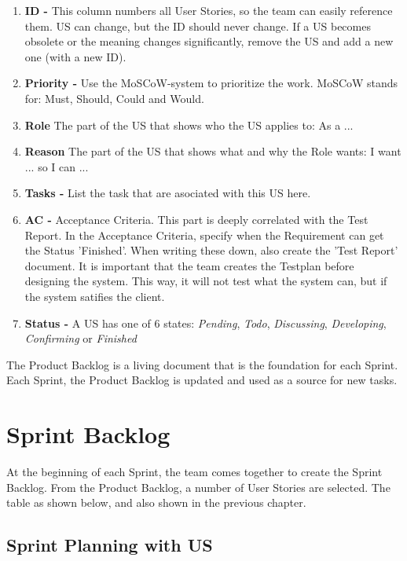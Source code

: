 \documentclass[10pt]{report}
\begin{document}
\begin{enumerate}
	\item \textbf{ID -} This column numbers all User Stories, so the team can easily reference them. US can change, but the ID should never change. If a US becomes obsolete or the meaning changes significantly, remove the US and add a new one (with a new ID).
	\item \textbf{Priority -} Use the MoSCoW-system to prioritize the work. MoSCoW stands for: Must, Should, Could and Would.
	\item \textbf{Role} The part of the US that shows who the US applies to: As a ...
	\item \textbf{Reason} The part of the US that shows what and why the Role wants: I want ... so I can ...
	\item \textbf{Tasks -} List the task that are asociated with this US here.
	\item \textbf{AC -} Acceptance Criteria. This part is deeply correlated with the Test Report. In the Acceptance Criteria, specify when the Requirement can get the Status 'Finished'. When writing these down, also create the 'Test Report' document. It is important that the team creates the Testplan before designing the system. This way, it will not test what the system can, but if the system satifies the client.
	\item \textbf{Status -} A US has one of 6 states: 
		\emph{Pending}, \emph{Todo}, \emph{Discussing}, \emph{Developing}, \emph{Confirming} or \emph{Finished}
\end{enumerate}

\noindent The Product Backlog is a living document that is the foundation for each Sprint. Each Sprint, the Product Backlog is updated and used as a source for new tasks.

\newpage

\section{Sprint Backlog}

At the beginning of each Sprint, the team comes together to create the Sprint Backlog. From the Product Backlog, a number of User Stories are selected. The table as shown below, and also shown in the previous chapter.

\subsection{Sprint Planning with US}
\end{document}
